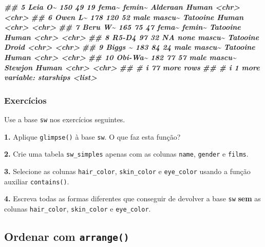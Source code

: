 \documentclass[
  portuguese,
  11pt,
  openany]{book}
\newenvironment{Shaded}{\begin{snugshade}}{\end{snugshade}}
\newcommand{\DocumentationTok}[1]{\textcolor[rgb]{0.56,0.35,0.01}{\textbf{\textit{#1}}}}
\newcounter{none} %
\begin{document}
\begin{Shaded}
\begin{Highlighting}[]
\DocumentationTok{\#\#  5 Leia O\textasciitilde{}    150    49       19   fema\textasciitilde{} femin\textasciitilde{} Alderaan  Human   \textless{}chr\textgreater{} \textless{}chr\textgreater{}   }
\DocumentationTok{\#\#  6 Owen L\textasciitilde{}    178   120       52   male  mascu\textasciitilde{} Tatooine  Human   \textless{}chr\textgreater{} \textless{}chr\textgreater{}   }
\DocumentationTok{\#\#  7 Beru W\textasciitilde{}    165    75       47   fema\textasciitilde{} femin\textasciitilde{} Tatooine  Human   \textless{}chr\textgreater{} \textless{}chr\textgreater{}   }
\DocumentationTok{\#\#  8 R5{-}D4       97    32       NA   none  mascu\textasciitilde{} Tatooine  Droid   \textless{}chr\textgreater{} \textless{}chr\textgreater{}   }
\DocumentationTok{\#\#  9 Biggs \textasciitilde{}    183    84       24   male  mascu\textasciitilde{} Tatooine  Human   \textless{}chr\textgreater{} \textless{}chr\textgreater{}   }
\DocumentationTok{\#\# 10 Obi{-}Wa\textasciitilde{}    182    77       57   male  mascu\textasciitilde{} Stewjon   Human   \textless{}chr\textgreater{} \textless{}chr\textgreater{}   }
\DocumentationTok{\#\# \# i 77 more rows}
\DocumentationTok{\#\# \# i 1 more variable: starships \textless{}list\textgreater{}}
\end{Highlighting}
\end{Shaded}

\subsubsection{Exercícios}\label{exercuxedcios-15}

Use a base \texttt{sw} nos exercícios seguintes.

\textbf{1.} Aplique \texttt{glimpse()} à base \texttt{sw}. O que faz esta função?

\textbf{2.} Crie uma tabela \texttt{sw\_simples} apenas com as colunas \texttt{name}, \texttt{gender} e \texttt{films}.

\textbf{3.} Selecione as colunas \texttt{hair\_color}, \texttt{skin\_color} e \texttt{eye\_color} usando a função
auxiliar \texttt{contains()}.

\textbf{4.} Escreva todas as formas diferentes que conseguir de devolver a base \texttt{sw} \textbf{sem}
as colunas \texttt{hair\_color}, \texttt{skin\_color} e \texttt{eye\_color}.

\subsection{\texorpdfstring{Ordenar com \texttt{arrange()}}{Ordenar com arrange()}}\label{ordenar-com-arrange}
\end{document}
